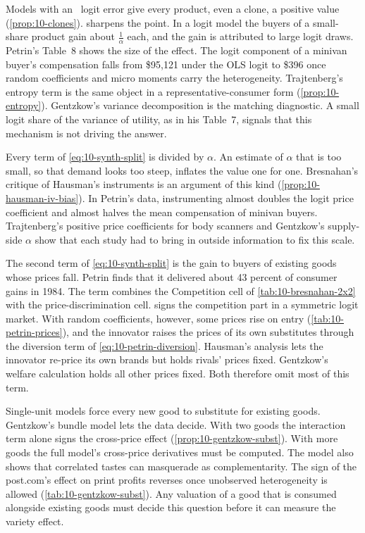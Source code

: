  Models with an \iid\ logit error give every product, even a
clone, a positive value (\cref{prop:10-clones}).  sharpens the point. In a logit model
the buyers of a small-share product gain about $\frac{1}{\alpha}$ each, and the gain is attributed to large logit
draws. Petrin's Table~8 shows the size of the effect. The logit component of a minivan buyer's compensation falls from
\$95,121 under the OLS logit to \$396 once random coefficients and micro moments carry the heterogeneity. Trajtenberg's
entropy term is the same object in a representative-consumer form (\cref{prop:10-entropy}). Gentzkow's variance
decomposition is the matching diagnostic. A small logit share of the variance of utility, as in his Table~7, signals
that this mechanism is not driving the answer.

 Every term of \eqref{eq:10-synth-split} is divided by $\alpha$. An
estimate of $\alpha$ that is too small, so that demand looks too steep, inflates the value one for one. Bresnahan's
critique of Hausman's instruments is an argument of this kind (\cref{prop:10-hausman-iv-bias}). In Petrin's data,
instrumenting almost doubles the logit price coefficient and almost halves the mean compensation of minivan buyers.
Trajtenberg's positive price coefficients for body scanners and Gentzkow's supply-side $\alpha$ show that each study
had to bring in outside information to fix this scale.

 The second term of \eqref{eq:10-synth-split} is the gain
to buyers of existing goods whose prices fall. Petrin finds that it delivered about 43 percent of consumer gains in
1984. The term combines the Competition cell of \cref{tab:10-bresnahan-2x2} with the price-discrimination cell.
 signs the competition part in a symmetric logit market. With random coefficients, however, some prices rise on entry (\cref{tab:10-petrin-prices}),
and the innovator raises the prices of its own substitutes through the diversion term of
\eqref{eq:10-petrin-diversion}. Hausman's analysis lets the innovator re-price its own brands but holds rivals' prices
fixed. Gentzkow's welfare calculation holds all other prices fixed. Both therefore omit most of this term.

 Single-unit models force every new good to substitute for existing goods.
Gentzkow's bundle model lets the data decide. With two goods the interaction term alone signs the cross-price
effect (\cref{prop:10-gentzkow-subst}). With more goods the full model's cross-price derivatives must be computed.
The model also shows that correlated tastes can masquerade as complementarity. The sign of the post.com's effect on print profits reverses once unobserved
heterogeneity is allowed (\cref{tab:10-gentzkow-subst}). Any valuation of a good that is consumed alongside existing
goods must decide this question before it can measure the variety effect.

